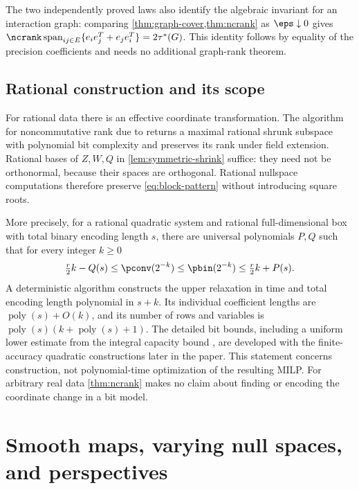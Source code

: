 The two independently proved laws also identify the algebraic invariant for an interaction graph: comparing \cref{thm:graph-cover,thm:ncrank} as $\eps\downarrow0$ gives $\ncrank\operatorname{span}_{ij\in E}\{e_ie_j^T+e_je_i^T\}=2\tau^*(G)$. This identity follows by equality of the precision coefficients and needs no additional graph-rank theorem.

\subsection{Rational construction and its scope}\label{subsec:rational-scope}

For rational data there is an effective coordinate transformation.
The algorithm for noncommutative rank due to
\citet[Theorem 1.5 and Lemma 5.3]{iqs2018} returns a maximal rational
shrunk subspace with polynomial bit complexity and preserves its rank
under field extension. Rational bases of $Z,W,Q$ in
\cref{lem:symmetric-shrink} suffice: they need not be orthonormal,
because their spaces are orthogonal. Rational nullspace computations
therefore preserve \eqref{eq:block-pattern} without introducing square
roots.

More precisely, for a rational quadratic system and rational
full-dimensional box with total binary encoding length $s$, there
are universal polynomials $P,Q$ such that for every integer $k\ge0$
\begin{equation}\label{eq:rational-rate-preview}
 \tfrac r2 k-Q(s)\le\pconv(2^{-k})\le\pbin(2^{-k})
                    \le\tfrac r2 k+P(s).
\end{equation}
A deterministic algorithm constructs the upper relaxation in time and
total encoding length polynomial in $s+k$. Its individual coefficient
lengths are $\operatorname{poly}(s)+O(k)$, and its number of rows and
variables is $\operatorname{poly}(s)(k+\operatorname{poly}(s)+1)$.
The detailed bit bounds, including a uniform lower estimate from the
integral capacity bound \citep[Theorem 2.18]{ggow2020}, are developed
with the finite-accuracy quadratic constructions later in the paper.
This statement concerns construction, not polynomial-time optimization
of the resulting MILP. For arbitrary real data
\cref{thm:ncrank} makes no claim about finding or encoding the coordinate
change in a bit model.

\section{Smooth maps, varying null spaces, and perspectives}\label{sec:smooth}

